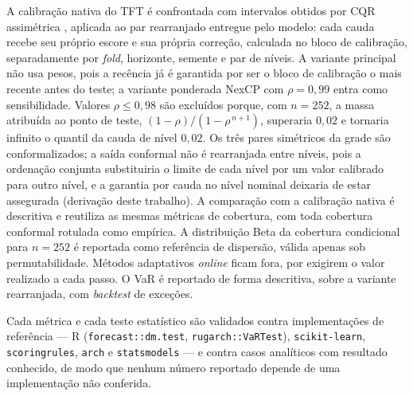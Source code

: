 A calibração nativa do TFT é confrontada com intervalos obtidos por CQR assimétrica \cite{ROMANO2019CQR}, aplicada ao par rearranjado entregue pelo modelo: cada cauda recebe seu próprio escore e sua própria correção, calculada no bloco de calibração, separadamente por \textit{fold}, horizonte, semente e par de níveis. A variante principal não usa pesos, pois a recência já é garantida por ser o bloco de calibração o mais recente antes do teste; a variante ponderada NexCP \cite{BARBER2023} com \(\rho = 0{,}99\) entra como sensibilidade. Valores \(\rho \leq 0{,}98\) são excluídos porque, com \(n = 252\), a massa atribuída ao ponto de teste, \((1-\rho)/(1-\rho^{\,n+1})\), superaria \(0{,}02\) e tornaria infinito o quantil da cauda de nível \(0{,}02\). Os três pares simétricos da grade são conformalizados; a saída conformal não é rearranjada entre níveis, pois a ordenação conjunta substituiria o limite de cada nível por um valor calibrado para outro nível, e a garantia por cauda no nível nominal deixaria de estar assegurada (derivação deste trabalho). A comparação com a calibração nativa é descritiva e reutiliza as mesmas métricas de cobertura, com toda cobertura conformal rotulada como empírica. A distribuição Beta da cobertura condicional para \(n = 252\) \cite{ANGELOPOULOS2023} é reportada como referência de dispersão, válida apenas sob permutabilidade. Métodos adaptativos \textit{online} \cite{GIBBS2021} ficam fora, por exigirem o valor realizado a cada passo. O VaR é reportado de forma descritiva, sobre a variante rearranjada, com \textit{backtest} de exceções.

Cada métrica e cada teste estatístico são validados contra implementações de referência --- R (\texttt{forecast::dm.test}, \texttt{rugarch::VaRTest}), \texttt{scikit-learn}, \texttt{scoringrules}, \texttt{arch} e \texttt{statsmodels} --- e contra casos analíticos com resultado conhecido, de modo que nenhum número reportado depende de uma implementação não conferida.

